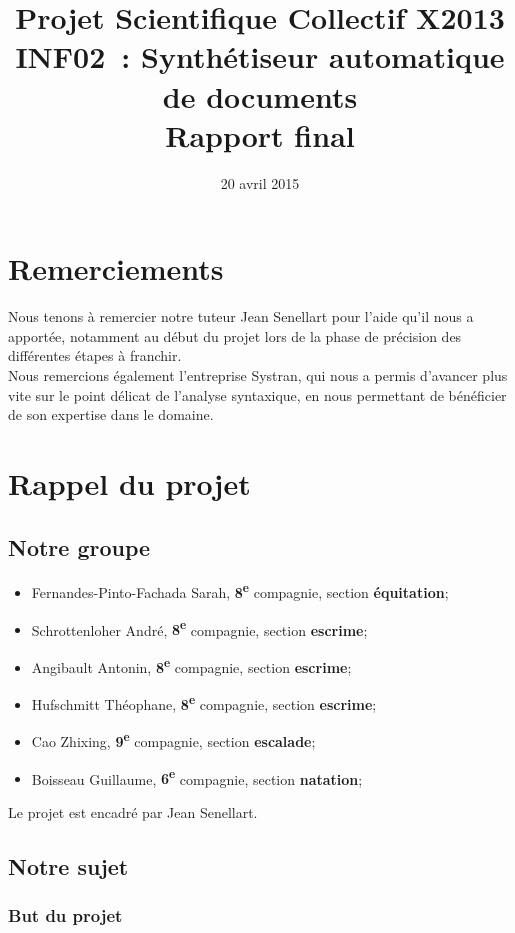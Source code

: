 \documentclass[a4paper, 12pt]{article}
\title{Projet Scientifique Collectif X2013 \\INF02~: Synthétiseur automatique de documents \\Rapport final}
\author{\membres} %
\date{20 avril 2015}
\begin{document}
\titrelong{}


\tableofcontents
\newpage

\section*{Remerciements}

Nous tenons à remercier notre tuteur Jean Senellart pour l'aide qu'il nous a apportée, notamment au début du projet lors de la phase de précision des différentes étapes à franchir.\\

Nous remercions également l'entreprise Systran, qui nous a permis d'avancer plus vite sur le point délicat de l'analyse syntaxique, en nous permettant de bénéficier de son expertise dans le domaine.

\section{Rappel du projet}

\subsection{Notre groupe}
\begin{itemize}
 \item Fernandes-Pinto-Fachada Sarah, \textbf{8\textsuperscript{e}} compagnie, section \textbf{équitation};
 \item Schrottenloher André, \textbf{8\textsuperscript{e}} compagnie, section \textbf{escrime};
 \item Angibault Antonin, \textbf{8\textsuperscript{e}} compagnie, section \textbf{escrime};
 \item Hufschmitt Théophane, \textbf{8\textsuperscript{e}} compagnie, section \textbf{escrime};
 \item Cao Zhixing, \textbf{9\textsuperscript{e}} compagnie, section \textbf{escalade};
 \item Boisseau Guillaume, \textbf{6\textsuperscript{e}} compagnie, section \textbf{natation};
\end{itemize}

Le projet est encadré par Jean Senellart.

\subsection{Notre sujet}

\subsubsection{But du projet}
\end{document}

